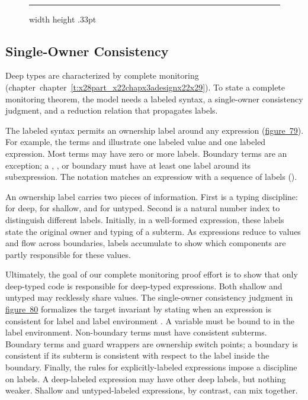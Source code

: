 \documentclass[ twoside,open=right,titlepage,numbers=noenddot,headinclude,%
                footinclude=true,cleardoublepage=empty,abstract=off,
                BCOR=5mm,paper=a4,fontsize=11pt,%
                ngerman,american,%
                parts,pdfspacing]{scrreprt}
\newcommand{\ChapRef}[2]{\SecRef{#1}{#2}}
\newcommand{\SecRef}[2]{section~#1}
\newcommand{\ChapRefLocal}[3]{\hyperref[#1]{\ChapRef{#2}{#3}}}
\newcommand{\Ssubsubsection}[2]{\subsubsection[#1]{#2}}
\newcommand{\Legend}[1]{~

                        \hrule width \hsize height .33pt
                        \vspace{4pt}
                        \legend{#1}}
\newcommand{\FigureTarget}[2]{#1}
\newcommand{\FigureRef}[2]{#1}
\newcommand{\FigureSetRef}{\refstepcounter{figure}}
\newenvironment{FigureMulti}{\begin{figure*}[t!p]\FigureSetRef}{\end{figure*}}
\newcommand{\Centertext}[1]{\begin{center}#1\end{center}}
\renewcommand{\Ssubsubsection}[2]{\subsection[#1]{#2}}
\renewcommand{\ChapRefLocal}[3]{chapter~\ref{#1}}
\renewenvironment{FigureMulti}{\begin{figure}\FigureSetRef}{\end{figure}}
\begin{document}
\begin{FigureMulti}
\Centertext{\Legend{\FigureTarget{\label{t:x28counter_x28x22figurex22_x22figx3abothx3aextrax2drrx22x29x29}Figure~78: }{t:x28counter_x28x22figurex22_x22figx3abothx3aextrax2drrx22x29x29}Semantic metafunctions}}\end{FigureMulti}

\Ssubsubsection{Single{-}Owner Consistency}{Single{-}Owner Consistency}\label{t:x28part_x22secx3abothx3amodelx3aownershipx22x29}

Deep types are characterized by complete monitoring (chapter~\ChapRefLocal{t:x28part_x22chapx3adesignx22x29}{4}{Design Analysis Method}).
To state a complete monitoring theorem, the model needs a labeled syntax,
 a single{-}owner consistency judgment, and a reduction relation that propagates
 labels.

The labeled syntax permits an ownership label around any expression (\hyperref[t:x28counter_x28x22figurex22_x22figx3abothx3aownershipx2dsyntaxx22x29x29]{figure~\FigureRef{79}{t:x28counter_x28x22figurex22_x22figx3abothx3aownershipx2dsyntaxx22x29x29}}).
For example, the terms  and 
 illustrate one labeled value and one labeled expression.
Most terms may have zero or more labels.
Boundary terms are an exception;
 a \relax{$\swrap$}, \relax{$\sscan$}, or \relax{$\snoop$} boundary must have at least one label
 around its subexpression.
The notation  matches an expressiow with a sequence of labels
 ().

An ownership label  carries two pieces of information.
First is a typing discipline: \relax{$\sdowner$} for deep,
 \relax{$\ssowner$} for shallow, and \relax{$\suowner$} for untyped.
Second is a natural number index to distinguish different labels.
Initially, in a well{-}formed expression, these labels state the original owner
 and typing of a subterm.
As expressions reduce to values and flow across boundaries, labels accumulate
 to show which components are partly responsible for these values.

Ultimately, the goal of our complete monitoring proof effort is to show that
 only deep{-}typed code is responsible for deep{-}typed expressions.
Both shallow and untyped may recklessly share values.
The single{-}owner consistency judgment in \hyperref[t:x28counter_x28x22figurex22_x22figx3abothx3aownershipx2dconsistencyx22x29x29]{figure~\FigureRef{80}{t:x28counter_x28x22figurex22_x22figx3abothx3aownershipx2dconsistencyx22x29x29}}
 formalizes the target invariant by stating when
 an expression is consistent for label  and label environment
 .
A variable must be bound to  in the label environment.
Non{-}boundary terms must have consistent subterms.
Boundary terms and guard wrappers are ownership switch points;
 a boundary is consistent if its subterm is consistent with respect to the
 label inside the boundary.
Finally, the rules for explicitly{-}labeled expressions impose a discipline
 on labels.
A deep{-}labeled expression may have other deep labels, but nothing weaker.
Shallow and untyped{-}labeled expressions, by contrast, can mix together.
\end{document}
